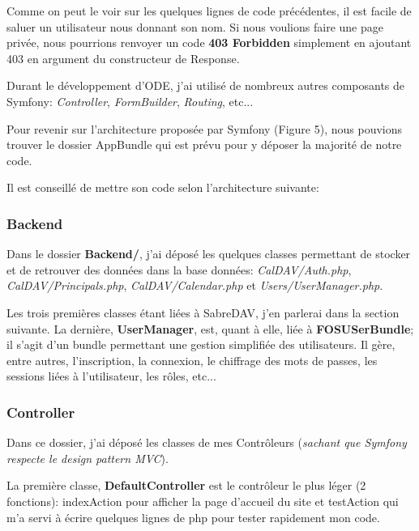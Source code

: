 Comme on peut le voir sur les quelques lignes de code précédentes, il est facile de saluer un utilisateur nous donnant son nom. Si nous voulions faire une page privée, nous pourrions renvoyer un code \textbf{403 Forbidden} simplement en ajoutant 403 en argument du constructeur de Response.

Durant le développement d'ODE, j'ai utilisé de nombreux autres composants de Symfony: \textit{Controller}, \textit{FormBuilder}, \textit{Routing}, etc...

\vspace{1cm}

Pour revenir sur l'architecture proposée par Symfony (Figure 5), nous pouvions trouver le dossier AppBundle qui est prévu pour y déposer la majorité de notre code.


Il est conseillé de mettre son code selon l'architecture suivante:

\subsubsection*{Backend}

Dans le dossier \textbf{Backend/}, j'ai déposé les quelques classes permettant de stocker et de retrouver des données dans la base données: \textit{CalDAV/Auth.php}, \textit{CalDAV/Principals.php}, \textit{CalDAV/Calendar.php} et \textit{Users/UserManager.php}.

Les trois premières classes étant liées à SabreDAV, j'en parlerai dans la section suivante. La dernière, \textbf{UserManager}, est, quant à elle, liée à \textbf{FOSUSerBundle}; il s'agit d'un bundle permettant une gestion simplifiée des utilisateurs. Il gère, entre autres, l'inscription, la connexion, le chiffrage des mots de passes, les sessions liées à l'utilisateur, les rôles, etc...

\subsubsection*{Controller}

Dans ce dossier, j'ai déposé les classes de mes Contrôleurs (\textit{sachant que Symfony respecte le design pattern MVC}).

La première classe, \textbf{DefaultController} est le contrôleur le plus léger (2 fonctions): indexAction pour afficher la page d'accueil du site et testAction qui m'a servi à écrire quelques lignes de php pour tester rapidement mon code.

